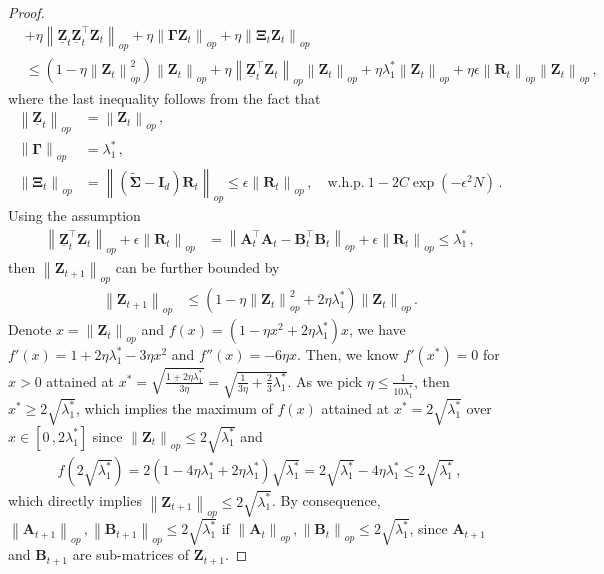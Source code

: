 \begin{proof}
\begin{align*}
        & +\eta\left\|\underline{\bm Z}_t\underline{\bm Z}_t^{\!\top}\bm Z_t\right\|_{op}+\eta\left\|\bm \Gamma \bm Z_t\right\|_{op}+\eta \left\|\bm \Xi_t \bm Z_t\right\|_{op}\\
        & \leq \left(1-\eta \left\|\bm Z_{t}\right\|_{op}^2\right)\left\|\bm Z_{t}\right\|_{op}
        + \eta \left\|\underline{\bm Z}_t^{\!\top}\bm Z_t\right\|_{op}\left\|\bm Z_{t}\right\|_{op} + \eta \lambda_1^* \left\|\bm Z_{t}\right\|_{op}+\eta \epsilon \left\|\bm R_t\right\|_{op} \left\|\bm Z_{t}\right\|_{op}\,,
    \end{align*}
    where the last inequality follows from the fact that
    \begin{align*}
        \left\|\underline{\bm Z}_t\right\|_{op}&=\left\|\bm Z_t\right\|_{op}\,,\\
        \left\|\bm \Gamma\right\|_{op}&=\lambda_1^*\,,\\
        \left\|\bm \Xi_t\right\|_{op}&=\left\|\left(\widetilde{\bm \Sigma}-\bm I_d\right)\bm R_t\right\|_{op}\leq \epsilon \left\|\bm R_t\right\|_{op}\,, \quad \mbox{w.h.p.}~1 - 2C\exp(-\epsilon^2 N)\,.
    \end{align*}
    Using the assumption
    \begin{align*}
        \left\|\underline{\bm Z}_t^{\!\top}\bm Z_t\right\|_{op}+ \epsilon \left\|\bm R_t\right\|_{op} & = \left\|\bm A_t^{\!\top}\bm A_t - \bm B_t^{\!\top}\bm B_t\right\|_{op} + \epsilon \left\|\bm R_t\right\|_{op} \leq \lambda_1^*\,,
    \end{align*}
    then $ \left\|\bm Z_{t+1}\right\|_{op}$ can be further bounded by
    \begin{align}
        \left\|\bm Z_{t+1}\right\|_{op} & \leq \left(1-\eta \left\|\bm Z_{t}\right\|_{op}^2 + 2 \eta \lambda_1^*\right)\left\|\bm Z_{t}\right\|_{op}\label{third-order-eq}\,.
    \end{align}
    Denote $x=\left\|\bm Z_{t}\right\|_{op}$ and $f(x)=\left(1-\eta x^2 + 2 \eta \lambda_1^*\right)x$, we have $f'(x)=1+2\eta\lambda_1^*-3\eta x^2$ and $f''(x)=-6\eta x$. Then, we know $f'(x^*)=0$ for $x>0$ attained at $x^*=\sqrt{\frac{1+2\eta\lambda_1^*}{3\eta}}=\sqrt{\frac{1}{3\eta}+\frac{2}{3}\lambda_1^*}$. As we pick $\eta \leq \frac{1}{10\lambda_1^*}$, then $x^*\geq 2\sqrt{\lambda_1^*}$, which implies the maximum of $f(x)$ attained at $x^*=2\sqrt{\lambda_1^*}$ over $x\in[0\,,2\lambda_1^*]$ since $\left\|\bm Z_{t}\right\|_{op}\leq 2\sqrt{\lambda_1^*}$ and
    \begin{align*}
        f(2\sqrt{\lambda_1^*})=2(1-4\eta\lambda_1^*+2\eta\lambda_1^*)\sqrt{\lambda_1^*}=2\sqrt{\lambda_1^*}-4\eta\lambda_1^*\leq 2\sqrt{\lambda_1^*}\,,
    \end{align*}
   which directly implies $\left\|\bm Z_{t+1}\right\|_{op}\leq 2\sqrt{\lambda_1^*}$. By consequence, $\left\|\bm A_{t+1}\right\|_{op}\,,\left\|\bm B_{t+1}\right\|_{op}\leq 2\sqrt{\lambda_1^*}$ if $\left\|\bm A_{t}\right\|_{op}\,,\left\|\bm B_{t}\right\|_{op}\leq 2\sqrt{\lambda_1^*}$, since $\bm A_{t+1}$ and $\bm B_{t+1}$ are sub-matrices of $\bm Z_{t+1}$.
\end{proof}

